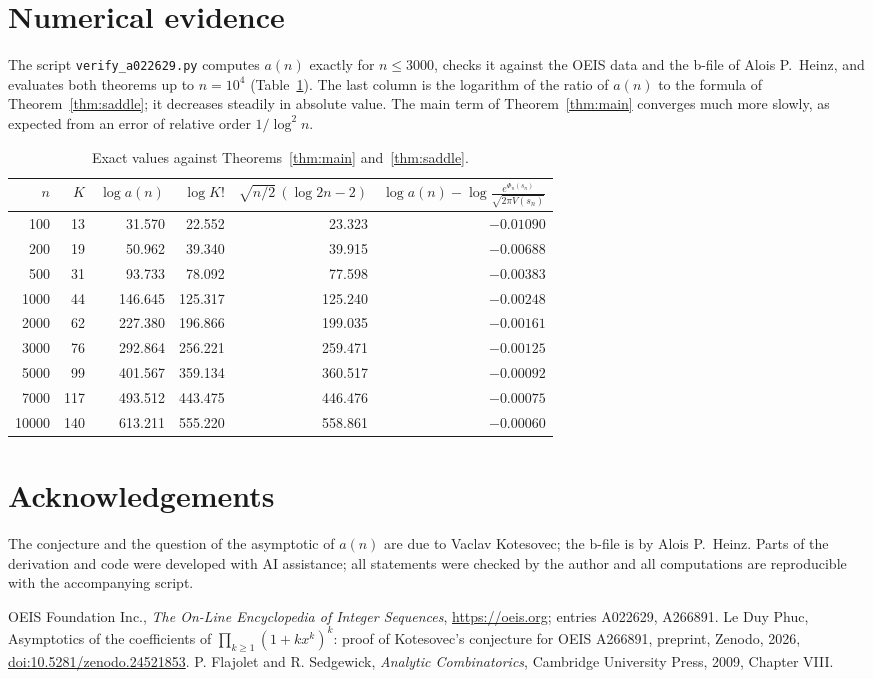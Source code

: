 \documentclass[11pt,a4paper]{article}
\theoremstyle{remark}
\begin{document}
\section{Numerical evidence}\label{sec:num}

The script \texttt{verify\_a022629.py} computes $a(n)$ exactly for $n\le3000$, checks it against the OEIS data and the b-file of Alois P.~Heinz, and evaluates both theorems up to $n=10^4$ (Table~\ref{tab:num}). The last column is the logarithm of the ratio of $a(n)$ to the formula of Theorem~\ref{thm:saddle}; it decreases steadily in absolute value. The main term of Theorem~\ref{thm:main} converges much more slowly, as expected from an error of relative order $1/\log^2n$.

\begin{table}[h]
\centering
\begin{tabular}{rrrrrr}
\toprule
$n$ & $K$ & $\log a(n)$ & $\log K!$ & $\sqrt{n/2}\,(\log 2n-2)$ & $\log a(n)-\log\frac{e^{\Phi_n(s_n)}}{\sqrt{2\pi V(s_n)}}$\\
\midrule
100 & 13 & 31.570 & 22.552 & 23.323 & $-0.01090$\\
200 & 19 & 50.962 & 39.340 & 39.915 & $-0.00688$\\
500 & 31 & 93.733 & 78.092 & 77.598 & $-0.00383$\\
1000 & 44 & 146.645 & 125.317 & 125.240 & $-0.00248$\\
2000 & 62 & 227.380 & 196.866 & 199.035 & $-0.00161$\\
3000 & 76 & 292.864 & 256.221 & 259.471 & $-0.00125$\\
5000 & 99 & 401.567 & 359.134 & 360.517 & $-0.00092$\\
7000 & 117 & 493.512 & 443.475 & 446.476 & $-0.00075$\\
10000 & 140 & 613.211 & 555.220 & 558.861 & $-0.00060$\\
\bottomrule
\end{tabular}
\caption{Exact values against Theorems~\ref{thm:main} and~\ref{thm:saddle}.}\label{tab:num}
\end{table}

\section*{Acknowledgements}
The conjecture and the question of the asymptotic of $a(n)$ are due to Vaclav Kotesovec; the b-file is by Alois P.~Heinz. Parts of the derivation and code were developed with AI assistance; all statements were checked by the author and all computations are reproducible with the accompanying script.

\begin{thebibliography}{9}
 OEIS Foundation Inc., \emph{The On-Line Encyclopedia of Integer Sequences}, \url{https://oeis.org}; entries A022629, A266891.
 Le Duy Phuc, Asymptotics of the coefficients of $\prod_{k\ge1}(1+kx^k)^k$: proof of Kotesovec's conjecture for OEIS A266891, preprint, Zenodo, 2026, \href{https://doi.org/10.5281/zenodo.24521853}{doi:10.5281/zenodo.24521853}.
 P. Flajolet and R. Sedgewick, \emph{Analytic Combinatorics}, Cambridge University Press, 2009, Chapter VIII.
\end{thebibliography}
\end{document}
